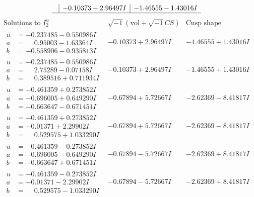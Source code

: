 \documentclass[1p]{elsarticle_modified}
\theoremstyle{definition}
\newcommand{\I}{\sqrt{-1}}
\begin{document}
$$\begin{array}{c|c|c}
 & -0.10373 - 2.96497 I & -1.46555 - 1.43016 I\\
 \hline 
 \end{array}$$\newpage$$\begin{array}{c|c|c}  
\text{Solutions to }I^u_{2}& \I (\text{vol} + \sqrt{-1}CS) & \text{Cusp shape}\\
 \hline 
\begin{aligned}
u &= -0.237485 - 0.550986 I \\
a &= \phantom{-}0.95003 - 1.63364 I \\
b &= -0.558906 - 0.935813 I\end{aligned}
 & -0.10373 + 2.96497 I & -1.46555 + 1.43016 I \\ \hline\begin{aligned}
u &= -0.237485 - 0.550986 I \\
a &= \phantom{-}2.75289 - 0.07158 I \\
b &= \phantom{-}0.389516 + 0.711934 I\end{aligned}
 & -0.10373 + 2.96497 I & -1.46555 + 1.43016 I \\ \hline\begin{aligned}
u &= -0.461359 + 0.273852 I \\
a &= -0.696005 + 0.649290 I \\
b &= -0.663647 - 0.671451 I\end{aligned}
 & -0.67894 + 5.72667 I & -2.62369 - 8.41817 I \\ \hline\begin{aligned}
u &= -0.461359 + 0.273852 I \\
a &= -0.01371 + 2.29902 I \\
b &= \phantom{-}0.529575 + 1.033290 I\end{aligned}
 & -0.67894 + 5.72667 I & -2.62369 - 8.41817 I \\ \hline\begin{aligned}
u &= -0.461359 - 0.273852 I \\
a &= -0.696005 - 0.649290 I \\
b &= -0.663647 + 0.671451 I\end{aligned}
 & -0.67894 - 5.72667 I & -2.62369 + 8.41817 I \\ \hline\begin{aligned}
u &= -0.461359 - 0.273852 I \\
a &= -0.01371 - 2.29902 I \\
b &= \phantom{-}0.529575 - 1.033290 I\end{aligned}
 & -0.67894 - 5.72667 I & -2.62369 + 8.41817 I \\ \hline\begin{aligned}

\end{aligned}
\end{array}$$
\end{document}
